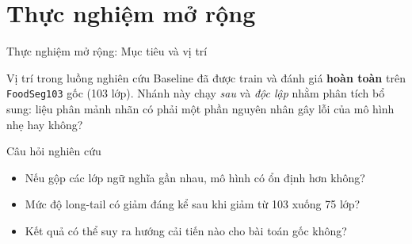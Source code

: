 \section{Thực nghiệm mở rộng}

\begin{frame}{Thực nghiệm mở rộng: Mục tiêu và vị trí}
  \begin{alertblock}{Vị trí trong luồng nghiên cứu}
    Baseline đã được train và đánh giá \textbf{hoàn toàn} trên \texttt{FoodSeg103} gốc (103 lớp).
    Nhánh này chạy \emph{sau} và \emph{độc lập} nhằm phân tích bổ sung: liệu phân mảnh nhãn có
    phải một phần nguyên nhân gây lỗi của mô hình nhẹ hay không?
  \end{alertblock}
  \vspace{0.4em}
  \begin{block}{Câu hỏi nghiên cứu}
    \begin{itemize}
      \item Nếu gộp các lớp ngữ nghĩa gần nhau, mô hình có ổn định hơn không?
      \item Mức độ long-tail có giảm đáng kể sau khi giảm từ 103 xuống 75 lớp?
      \item Kết quả có thể suy ra hướng cải tiến nào cho bài toán gốc không?
    \end{itemize}
  \end{block}
  \vspace{0.3em}
\end{frame}

